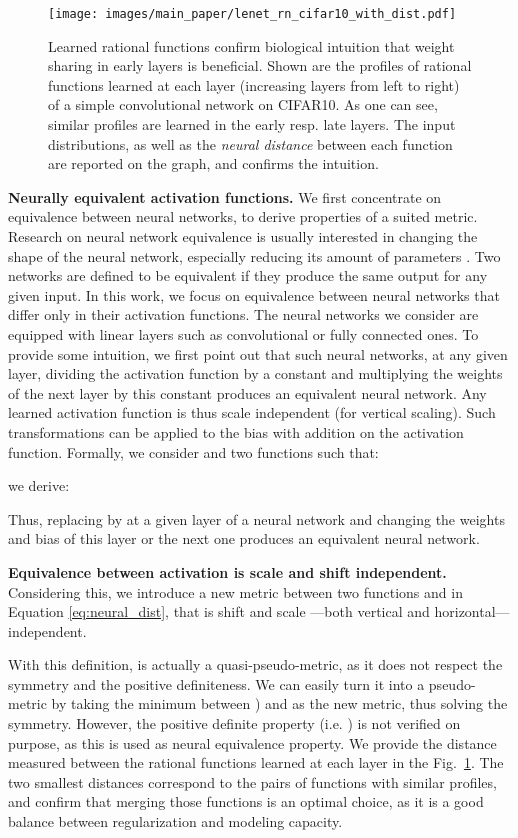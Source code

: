\documentclass{article}
\begin{document}
\begin{figure}[t]
    \centering
    \texttt{[image: images/main\_paper/lenet\_rn\_cifar10\_with\_dist.pdf]}
    \caption{Learned rational functions confirm biological intuition that weight sharing in early layers is beneficial. Shown are the profiles of rational functions learned at each layer (increasing layers from left to right) of a simple convolutional network on CIFAR10. As one can see, similar profiles are learned in the early resp. late layers. The input distributions, as well as the \textit{neural distance} between each function are reported on the graph, and confirms the intuition.}
    \label{fig:lenet_cifar10}
\end{figure}

\textbf{Neurally equivalent activation functions.}
We first concentrate on equivalence between neural networks, to derive properties of a suited metric.
Research on neural network equivalence is usually interested in changing the shape of the neural network, especially reducing its amount of parameters \cite{al2010equivalence, kumar2019equivalent}. Two networks are defined to be equivalent if they produce the same output for any given input. 
In this work, we focus on equivalence between neural networks that differ only in their activation functions. The neural networks we consider are equipped with linear layers such as convolutional or fully connected ones. To provide some intuition, we first point out that such neural networks, at any given layer, dividing the activation function by a constant and multiplying the weights of the next layer by this constant produces an equivalent neural network. Any learned activation function is thus scale independent (for vertical scaling). Such transformations can be applied to the bias with addition on the activation function. Formally, we consider  and  two functions such that:

we derive:

Thus, replacing  by  at a given layer of a neural network and changing the weights and bias of this layer or the next one produces an equivalent neural network. 

\textbf{Equivalence between activation is scale and shift independent.} Considering this, we introduce a new metric between two functions  and  in Equation  \ref{eq:neural_dist}, that is shift and scale ---both vertical and horizontal--- independent.


With this definition,  is actually a quasi-pseudo-metric, as it does not respect the symmetry and the positive definiteness. We can easily turn it into a pseudo-metric by taking the minimum between ) and  as the new metric, thus solving the symmetry. However, the positive definite property (i.e. ) is not verified on purpose, as this is used as neural equivalence property. We provide the distance measured between the rational functions learned at each layer in the Fig.~\ref{fig:lenet_cifar10}. The two smallest distances correspond to the pairs of functions with similar profiles, and confirm that merging those functions is an optimal choice, as it is a good balance between regularization and modeling capacity.
\end{document}
